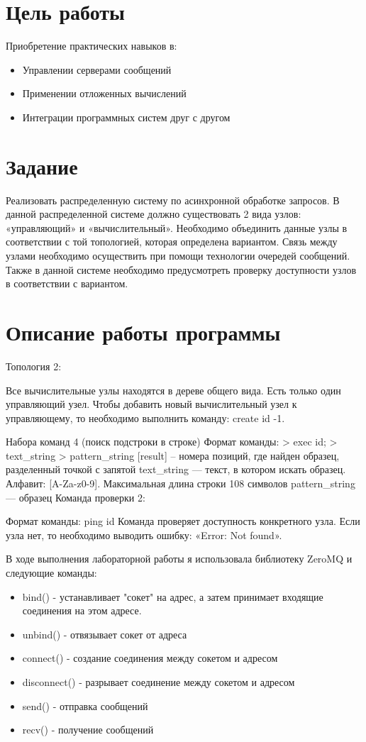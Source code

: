 \documentclass[a4paper, 12pt]{article}
\begin{document}
\section{Цель работы}
Приобретение практических навыков в:
\begin{itemize}
  \item Управлении серверами сообщений
  \item Применении отложенных вычислений
  \item Интеграции программных систем друг с другом
\end{itemize}

\section{Задание}
Реализовать распределенную систему по асинхронной обработке запросов. В данной распределенной системе должно существовать 2 вида узлов: «управляющий» и «вычислительный». Необходимо объединить данные узлы в соответствии с той топологией, которая определена вариантом. Связь между узлами необходимо осуществить при помощи технологии очередей сообщений. Также в данной системе необходимо предусмотреть проверку доступности узлов в соответствии с вариантом.

\section{Описание работы программы}
Топология 2:

Все вычислительные узлы находятся в дереве общего вида. Есть только один управляющий узел. Чтобы добавить новый вычислительный узел к управляющему, то необходимо выполнить команду: create id -1.

Набора команд 4 (поиск подстроки в строке)
Формат команды:
> exec id;
> text\_string
> pattern\_string
[result] – номера позиций, где найден образец, разделенный точкой с запятой
text\_string — текст, в котором искать образец. Алфавит: [A-Za-z0-9]. Максимальная длина строки
108 символов
pattern\_string — образец
Команда проверки 2:

Формат команды: ping id Команда проверяет доступность конкретного узла. Если узла нет, то необходимо выводить ошибку: «Error: Not found».

В ходе выполнения лабораторной работы я использовала библиотеку ZeroMQ и следующие команды:
\begin{itemize}
  \item bind() - устанавливает "сокет" на адрес, а затем принимает входящие соединения на этом адресе.
  \item unbind() - отвязывает сокет от адреса
  \item connect() - создание соединения между сокетом и адресом
  \item disconnect() - разрывает соединение между сокетом и адресом
  \item send() - отправка сообщений
  \item recv() - получение сообщений
\end{itemize}
\end{document}
